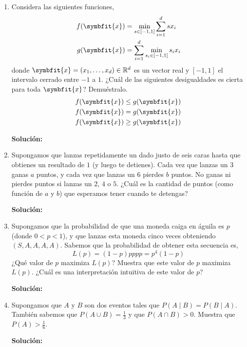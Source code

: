 \documentclass[11pt,letterpaper]{article}
\newenvironment{solution}{%
  \noindent\begin{shaded}
  \textbf{Solución:}\ }{
  \end{shaded}%
}
\newcommand{\bvec}[1]{\symbfit{#1}}
\begin{document}
\begin{enumerate}
\begin{solution}
  \end{solution}
\item%
  Considera las siguientes funciones,
  \[
  \begin{aligned}
    f(\bvec{x}) &= \min_{s\in[-1,1]}\sum_{i=1}^d sx_i \\
    g(\bvec{x}) &= \sum_{i=1}^d \min_{s_i\in[-1,1]} s_ix_i
  \end{aligned}
  \]
  donde \(\bvec{x} = (x_1,\dots,x_d)\in\mathbb{R}^d\) es un
  vector real y \([-1,1]\) el intervalo cerrado entre \(-1\) a
  \(1\). ¿Cuál de las siguientes desigualdades es cierta para toda
  \(\bvec{x}\)?  Demuéstralo.
  \[
  \begin{aligned}
    f(\bvec{x}) &\leq g(\bvec{x}) \\
    f(\bvec{x}) &= g(\bvec{x}) \\
    f(\bvec{x}) &\geq g(\bvec{x})
  \end{aligned}
  \]
  \begin{solution}
  \end{solution}    
\item%
  Supongamos que lanzas repetidamente un dado justo de seis caras
  hasta que obtienes un resultado de \(1\) (y luego te detienes).
  Cada vez que lanzas un \(3\) ganas \(a\) puntos, y cada vez que
  lanzas un \(6\) pierdes \(b\) puntos.  No ganas ni pierdes puntos si
  lanzas un \(2\), \(4\) o \(5\).  ¿Cuál es la cantidad de puntos
  (como función de \(a\) y \(b\)) que esperamos tener cuando te
  detengas?
  \begin{solution}
  \end{solution}
\item%
  Supongamos que la probabilidad de que una moneda caiga en águila es
  \(p\) (donde \(0 < p < 1\)), y que lanzas esta moneda cinco veces
  obteniendo \(\left(S, A, A, A, A\right)\).  Sabemos que la
  probabilidad de obtener esta secuencia es,
  \[ L(p) = (1-p)pppp = p^4(1-p) \]
  ¿Qué valor de \(p\) maximiza \(L(p)\)? Muestra que este valor de
  \(p\) maximiza \(L(p)\). ¿Cuál es una interpretación intuitiva de
  este valor de \(p\)?
  \begin{solution}
  \end{solution}
\item%
  Supongamos que \(A\) y \(B\) son dos eventos tales que \(P(A \mid B)
  = P(B \mid A)\).  También sabemos que \(P(A \cup B) = \frac{1}{3}\)
  y que \(P(A \cap B) > 0\).  Muestra que \(P(A) > \frac{1}{6}\).
  \begin{solution}
  \end{solution}
  

\end{enumerate}
\end{document}
